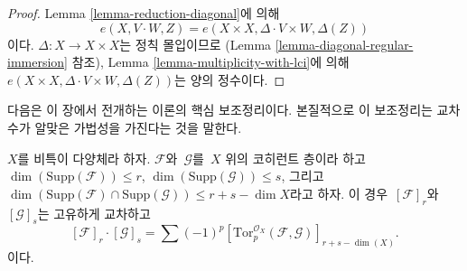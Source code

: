 \begin{proof}
Lemma \ref{lemma-reduction-diagonal}에 의해
$$
e(X, V \cdot W, Z) = e(X \times X, \Delta \cdot V \times W, \Delta(Z))
$$
이다. $\Delta : X \to X \times X$는 정칙 몰입이므로
(Lemma \ref{lemma-diagonal-regular-immersion} 참조),
Lemma \ref{lemma-multiplicity-with-lci}에 의해\ 
$e(X \times X, \Delta \cdot V \times W, \Delta(Z))$는 양의 정수이다.
\end{proof}

\noindent
다음은 이 장에서 전개하는 이론의 핵심 보조정리이다. 본질적으로 이
보조정리는 교차수가 알맞은 가법성을 가진다는 것을 말한다.

\begin{lemma}
\label{lemma-tor-sheaf}
\begin{reference}
\cite[Chapter V]{Serre_algebre_locale}
\end{reference}
$X$를 비특이 다양체라 하자. $\mathcal{F}$와\  $\mathcal{G}$를\  $X$ 위의
코히런트 층이라 하고\ 
$\dim(\text{Supp}(\mathcal{F})) \leq r$,
$\dim(\text{Supp}(\mathcal{G})) \leq s$, 그리고\ 
$\dim(\text{Supp}(\mathcal{F}) \cap \text{Supp}(\mathcal{G}) )
\leq r + s - \dim X$라고 하자. 이 경우\  $[\mathcal{F}]_r$와\ 
$[\mathcal{G}]_s$는 고유하게 교차하고
$$
[\mathcal{F}]_r \cdot [\mathcal{G}]_s =
\sum (-1)^p
[\text{Tor}_p^{\mathcal{O}_X}(\mathcal{F}, \mathcal{G})]_{r + s - \dim(X)}.
$$
이다.
\end{lemma}

